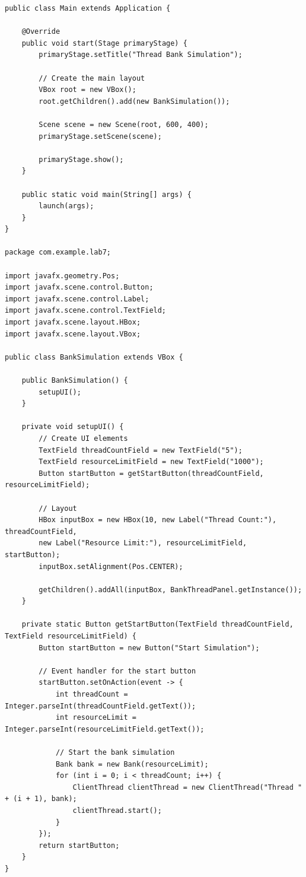 \documentclass[14pt]{extreport}
\begin{document}
\begin{normalsize}
\begin{lstlisting}
public class Main extends Application {
	
	@Override
	public void start(Stage primaryStage) {
		primaryStage.setTitle("Thread Bank Simulation");
		
		// Create the main layout
		VBox root = new VBox();
		root.getChildren().add(new BankSimulation());
		
		Scene scene = new Scene(root, 600, 400);
		primaryStage.setScene(scene);
		
		primaryStage.show();
	}
	
	public static void main(String[] args) {
		launch(args);
	}
}

package com.example.lab7;

import javafx.geometry.Pos;
import javafx.scene.control.Button;
import javafx.scene.control.Label;
import javafx.scene.control.TextField;
import javafx.scene.layout.HBox;
import javafx.scene.layout.VBox;

public class BankSimulation extends VBox {
	
	public BankSimulation() {
		setupUI();
	}
	
	private void setupUI() {
		// Create UI elements
		TextField threadCountField = new TextField("5");
		TextField resourceLimitField = new TextField("1000");
		Button startButton = getStartButton(threadCountField, resourceLimitField);
		
		// Layout
		HBox inputBox = new HBox(10, new Label("Thread Count:"), threadCountField,
		new Label("Resource Limit:"), resourceLimitField, startButton);
		inputBox.setAlignment(Pos.CENTER);
		
		getChildren().addAll(inputBox, BankThreadPanel.getInstance());
	}
	
	private static Button getStartButton(TextField threadCountField, TextField resourceLimitField) {
		Button startButton = new Button("Start Simulation");
		
		// Event handler for the start button
		startButton.setOnAction(event -> {
			int threadCount = Integer.parseInt(threadCountField.getText());
			int resourceLimit = Integer.parseInt(resourceLimitField.getText());
			
			// Start the bank simulation
			Bank bank = new Bank(resourceLimit);
			for (int i = 0; i < threadCount; i++) {
				ClientThread clientThread = new ClientThread("Thread " + (i + 1), bank);
				clientThread.start();
			}
		});
		return startButton;
	}
}

	\end{lstlisting}	
	

\end{normalsize}
\end{document}
